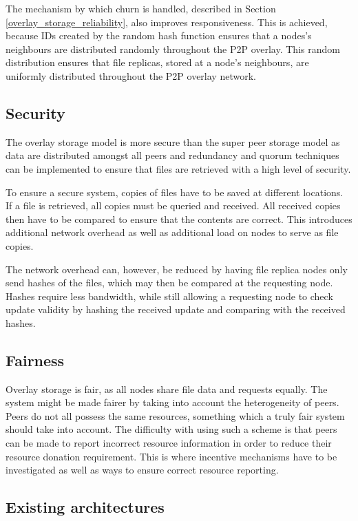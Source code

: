 The mechanism by which churn is handled, described in Section \ref{overlay_storage_reliability}, also improves responsiveness.  This is achieved,
because IDs created by the random hash function ensures that a nodes's neighbours are distributed randomly throughout the P2P overlay. This random
distribution ensures that file replicas, stored at a node's neighbours, are uniformly distributed throughout the P2P overlay network.


\subsection{Security}
The overlay storage model is more secure than the super peer storage model as data are distributed amongst all peers and redundancy and quorum
techniques can be implemented to ensure that files are retrieved with a high level of security.

To ensure a secure system, copies of files have to be saved at different locations. If a file is retrieved, all copies must be queried and received.
All received copies then have to be compared to ensure that the contents are correct. This introduces additional network overhead as well as
additional load on nodes to serve as file copies.

The network overhead can, however, be reduced by having file replica nodes only send hashes of the files, which may then be compared at the
requesting node. Hashes require less bandwidth, while still allowing a requesting node to check update validity by hashing the received update and
comparing with the received hashes.

\subsection{Fairness}

Overlay storage is fair, as all nodes share file data and requests equally. The system might be made fairer by taking into account the heterogeneity
of peers. Peers do not all possess the same resources, something which a truly fair system should take into account. The difficulty with using such a
scheme is that peers can be made to report incorrect resource information in order to reduce their resource donation requirement. This is where
incentive mechanisms have to be investigated as well as ways to ensure correct resource reporting.

\subsection{Existing architectures}

